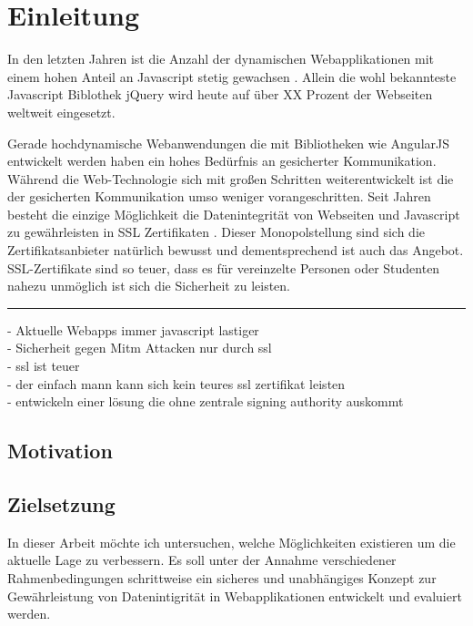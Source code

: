 
\section{Einleitung}

\cite[S. 12ff.]{asdflol}
\cite[sdflol]{stallman99:telepolis}



In den letzten Jahren ist die Anzahl der dynamischen Webapplikationen mit einem hohen Anteil an Javascript stetig gewachsen \quelle.
Allein die wohl bekannteste Javascript Biblothek jQuery \urlref wird heute auf über XX Prozent der Webseiten weltweit eingesetzt. \quelle

Gerade hochdynamische Webanwendungen die mit Bibliotheken wie AngularJS \urlref entwickelt werden haben ein hohes Bedürfnis an gesicherter Kommunikation.
Während die Web-Technologie sich mit großen Schritten weiterentwickelt ist die der gesicherten Kommunikation umso weniger vorangeschritten.
Seit Jahren besteht die einzige Möglichkeit die Datenintegrität von Webseiten und Javascript zu gewährleisten in SSL Zertifikaten \iref.
Dieser Monopolstellung sind sich die Zertifikatsanbieter natürlich bewusst und dementsprechend ist auch das Angebot.
SSL-Zertifikate sind so teuer, dass es für vereinzelte Personen oder Studenten nahezu unmöglich ist sich die Sicherheit zu leisten.


\noindent\rule{\textwidth}{0.4pt}


- Aktuelle Webapps immer javascript lastiger\\
- Sicherheit gegen Mitm Attacken nur durch ssl\\
- ssl ist teuer \\
- der einfach mann kann sich kein teures ssl zertifikat leisten \\
- entwickeln einer lösung die ohne zentrale signing authority auskommt \\

\subsection{Motivation}
\tbd

\subsection{Zielsetzung}

In dieser Arbeit möchte ich untersuchen, welche Möglichkeiten existieren um die aktuelle Lage zu verbessern. Es soll unter der Annahme verschiedener Rahmenbedingungen schrittweise ein sicheres und unabhängiges Konzept zur Gewährleistung von Datenintigrität in Webapplikationen entwickelt und evaluiert werden.

